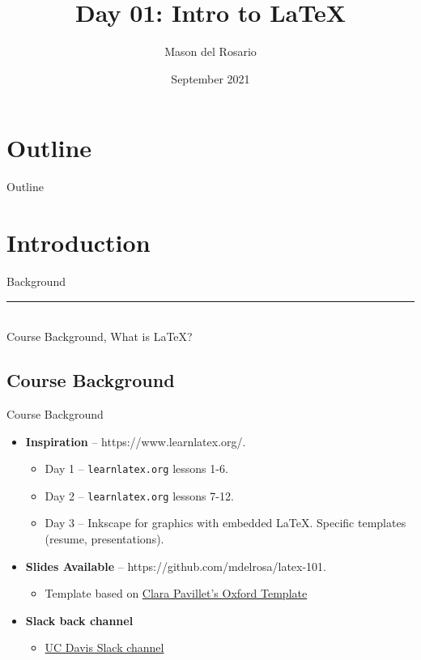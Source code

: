 \documentclass{beamer}
\title{Day 01: Intro to \LaTeX }
\author{\small{Mason del Rosario}}
\institute{\LaTeX 101}
\date{September 2021} %
\begin{document}
\footnotesize{
% 


{ 
\frame{\titlepage}}

\section*{Outline}\begin{frame}{Outline}\tableofcontents\end{frame}

\section{Introduction}

  \begin{frame}[plain]
    \vfill
    \centering
    \begin{beamercolorbox}[sep=8pt,center,shadow=true,rounded=true]{Background}
      \insertsectionhead\par%
      \color{davisblue}\noindent\rule{10cm}{1pt} \\
      \footnotesize{Course Background, What is \LaTeX?}
    \end{beamercolorbox}
    \vfill
  \end{frame}
  
\subsection{Course Background}

  \begin{frame}{Course Background}
    \begin{itemize} 
      \item \textbf{Inspiration} -- https://www.learnlatex.org/. 
        \begin{itemize}
          \item Day 1 -- \texttt{learnlatex.org} lessons 1-6.
          \item Day 2 -- \texttt{learnlatex.org} lessons 7-12.
          \item Day 3 -- Inkscape for graphics with embedded \LaTeX. Specific templates (resume, presentations).
        \end{itemize}
      \item \textbf{Slides Available} -- https://github.com/mdelrosa/latex-101.
      \begin{itemize}
        \item Template based on \href{https://www.overleaf.com/latex/templates/oxpav/xnjgrxthvjhg}{Clara Pavillet's Oxford Template}
      \end{itemize}
      \item \textbf{Slack back channel}
      \begin{itemize}
        \item \href{https://join.slack.com/share/zt-ul82okyc-SI2GftuwPx_lFyBXll9rjw}{UC Davis Slack channel}
      \end{itemize}
    \end{itemize}
  \end{frame}

}
\end{document}
